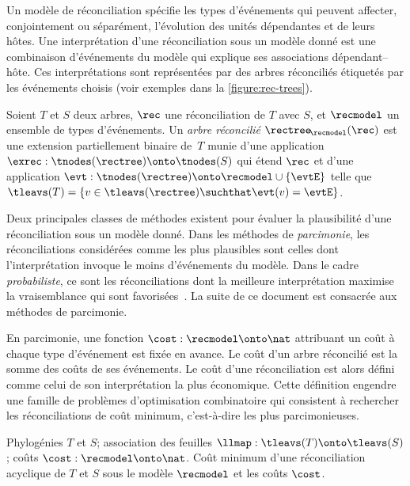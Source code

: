 Un modèle de réconciliation spécifie les types d’événements qui peuvent affecter, conjointement ou séparément, l’évolution des unités dépendantes et de leurs hôtes.
Une interprétation d’une réconciliation sous un modèle donné est une combinaison d’événements du modèle qui explique ses associations dépendant--hôte.
Ces interprétations sont représentées par des arbres réconciliés étiquetés par les événements choisis (voir exemples dans la \cref{figure:rec-trees}).

\begin{definition}\label{definition:rectree}
    Soient \(T\) et \(S\) deux arbres, \(\rec\) une réconciliation de \(T\) avec \(S\), et \(\recmodel\) un ensemble de types d’événements.
    Un \emph{arbre réconcilié} \(\rectree_{\!\recmodel}(\rec)\) est une extension partiellement binaire de~\(T\) munie d’une application \(\exrec : \tnodes(\rectree) \onto \tnodes(S)\) qui étend \(\rec\) et d’une application \(\evt : \tnodes(\rectree) \onto \recmodel \cup \{\evtE\}\)
    telle que \(\tleavs(T) = \{ v \in \tleavs(\rectree) \suchthat \evt(v) = \evtE \}\).
\end{definition}

Deux principales classes de méthodes existent pour évaluer la plausibilité d’une réconciliation sous un modèle donné.
Dans les méthodes de \emph{parcimonie}, les réconciliations considérées comme les plus plausibles sont celles dont l’interprétation invoque le moins d’événements du modèle.
Dans le cadre \emph{probabiliste}, ce sont les réconciliations dont la meilleure interprétation maximise la vraisemblance qui sont favorisées~\parencite{Doyon2011ModelsAlgorithmsPrograms}.
La suite de ce document est consacrée aux méthodes de parcimonie.

En parcimonie, une fonction \(\cost : \recmodel \onto \nat\) attribuant un coût à chaque type d’événement est fixée en avance.
Le coût d’un arbre réconcilié est la somme des coûts de ses événements.
Le coût d’une réconciliation est alors défini comme celui de son interprétation la plus économique.
Cette définition engendre une famille de problèmes d’optimisation combinatoire qui consistent à rechercher les réconciliations de coût minimum, c’est-à-dire les plus parcimonieuses.

    {Phylogénies \(T\) et \(S\);
     association des feuilles \(\llmap : \tleavs(T) \onto \tleavs(S)\);
     coûts \(\cost : \recmodel \onto \nat\).}
    {Coût minimum d’une réconciliation acyclique de \(T\) et \(S\)
     sous le modèle \(\recmodel\) et les coûts \(\cost\).}

